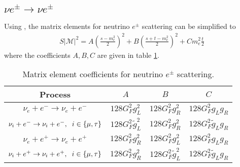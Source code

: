 \subsection{ $\nu e^\pm\rightarrow \nu e^\pm$}
 Using , the matrix elements for neutrino $e^\pm$ scattering can be simplified to
\begin{align}
\label{TA002}
S|\mathcal{M}|^2=A\left(\frac{s-m_e^2}{2}\right)^2+B\left(\frac{s+t-m_e^2}{2}\right)^2+Cm_e^2\frac{t}{2}
\end{align}
 where the coefficients $A,B,C$ are given in table \ref{table:nu_e_coeff}.

\begin{table}[H]
\centering 
\begin{tabular}{|c|c|c|c|}
\hline
Process &$A$&$B$&$C$  \\
\hline
$\nu_e+e^-\rightarrow \nu_e+e^-$&$128G_F^2g_L^2$&$128G_F^2g_R^2$&$128G_F^2g_Lg_R$\\
\hline
$\nu_i+e^-\rightarrow \nu_i+e^-,\hspace{2mm} i\in\{\mu,\tau\}$&$128G_F^2\tilde g_L^2$&$128G_F^2g_R^2$&$128G_F^2\tilde g_Lg_R$\\
\hline
$\nu_e+e^+\rightarrow \nu_e+e^+$&$128G_F^2g_R^2$&$128G_F^2g_L^2$&$128G_F^2g_Lg_R$\\
\hline
$\nu_i+e^+\rightarrow \nu_i+e^+,\hspace{2mm} i\in\{\mu,\tau\}$&$128G_F^2 g_R^2$&$128G_F^2\tilde g_L^2$&$128G_F^2\tilde g_Lg_R$\\
\hline
\end{tabular}
\caption{Matrix element coefficients for neutrino $e^\pm$ scattering.}
\label{table:nu_e_coeff}
\end{table}



